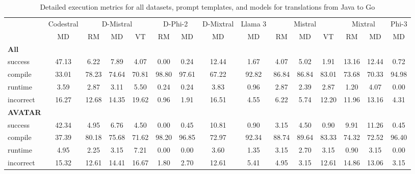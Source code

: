 \begin{table}[t]
\caption{Detailed execution metrics for all datasets, prompt templates, and models for translations from Java to Go}
\label{tab:iteration_1_stats_percent_Java_Go}

\setlength{\tabcolsep}{2.5pt} %
\renewcommand{\arraystretch}{1} %

\footnotesize
\begin{tabular}{@{}lcccccccccccccc@{}}
\toprule
 & Codestral & \multicolumn{3}{c}{D-Mistral} & \multicolumn{2}{c}{D-Phi-2} & D-Mixtral & Llama 3 & \multicolumn{3}{c}{Mistral}  & \multicolumn{2}{c}{Mixtral} & Phi-3 \\ 

\cmidrule(l){2-2}
\cmidrule(l){3-5}
\cmidrule(l){6-7}
\cmidrule(l){8-8}
\cmidrule(l){9-9}
\cmidrule(l){10-12}
\cmidrule(l){13-14}
\cmidrule(l){15-15}

& \multicolumn{1}{c}{MD}
& \multicolumn{1}{c}{RM}
& \multicolumn{1}{c}{MD}
& \multicolumn{1}{c}{VT}
& \multicolumn{1}{c}{RM}
& \multicolumn{1}{c}{MD} 
& \multicolumn{1}{c}{MD} 
& \multicolumn{1}{c}{MD} 
& \multicolumn{1}{c}{RM} 
& \multicolumn{1}{c}{MD} 
& \multicolumn{1}{c}{VT} 
& \multicolumn{1}{c}{RM}
& \multicolumn{1}{c}{MD} 
& \multicolumn{1}{c}{MD} \\

\midrule
\textbf{All} & & & & & & & & & & & & & & \\ 
\quad success & 47.13 & 6.22 & 7.89 & 4.07 & 0.00 & 0.24 & 12.44 & 1.67 & 4.07 & 5.02 & 1.91 & 13.16 & 12.44 & 0.72 \\
\qquad compile & 33.01 & 78.23 & 74.64 & 70.81 & 98.80 & 97.61 & 67.22 & 92.82 & 86.84 & 86.84 & 83.01 & 73.68 & 70.33 & 94.98 \\
\qquad runtime & 3.59 & 2.87 & 3.11 & 5.50 & 0.24 & 0.24 & 3.83 & 0.96 & 2.87 & 2.39 & 2.87 & 1.20 & 4.07 & 0.00 \\
\qquad incorrect & 16.27 & 12.68 & 14.35 & 19.62 & 0.96 & 1.91 & 16.51 & 4.55 & 6.22 & 5.74 & 12.20 & 11.96 & 13.16 & 4.31 \\
 

\textbf{AVATAR} & & & & & & & & & & & & & & \\
\quad success & 42.34 & 4.95 & 6.76 & 4.50 & 0.00 & 0.45 & 10.81 & 0.90 & 3.15 & 4.50 & 0.90 & 9.91 & 11.26 & 0.45 \\
\qquad compile & 37.39 & 80.18 & 75.68 & 71.62 & 98.20 & 96.85 & 72.97 & 92.34 & 88.74 & 89.64 & 83.33 & 74.32 & 72.52 & 96.40 \\
\qquad runtime & 4.95 & 2.25 & 3.15 & 7.21 & 0.00 & 0.00 & 3.60 & 1.35 & 3.15 & 2.70 & 3.15 & 0.90 & 3.15 & 0.00 \\
\qquad incorrect & 15.32 & 12.61 & 14.41 & 16.67 & 1.80 & 2.70 & 12.61 & 5.41 & 4.95 & 3.15 & 12.61 & 14.86 & 13.06 & 3.15 \\
 


\end{tabular}
\end{table}
